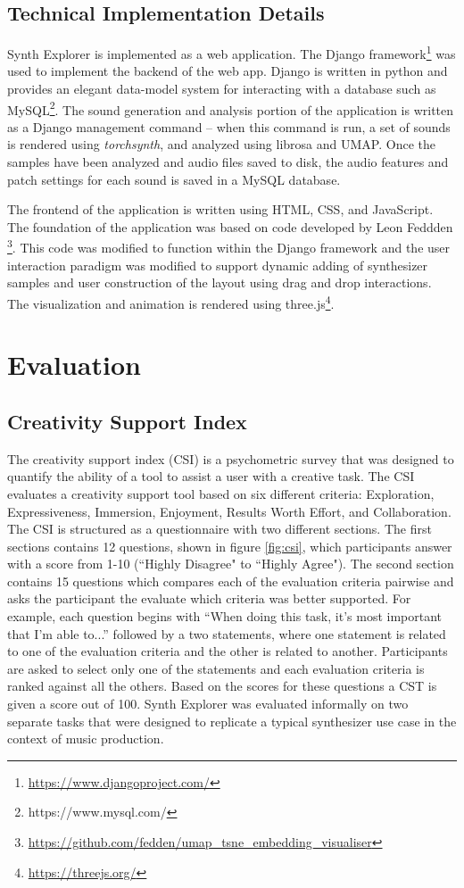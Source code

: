 \subsection{Technical Implementation Details}
Synth Explorer is implemented as a web application. The Django framework\footnote{\url{https://www.djangoproject.com/}} was used to implement the backend of the web app. Django is written in python and provides an elegant data-model system for interacting with a database such as MySQL\footnote{{https://www.mysql.com/}}. The sound generation and analysis portion of the application is written as a Django management command -- when this command is run, a set of sounds is rendered using \textit{torchsynth}, and analyzed using librosa and UMAP. Once the samples have been analyzed and audio files saved to disk, the audio features and patch settings for each sound is saved in a MySQL database.

The frontend of the application is written using HTML, CSS, and JavaScript. The foundation of the application was based on code developed by Leon Feddden \footnote{\url{https://github.com/fedden/umap_tsne_embedding_visualiser}}. This code was modified to function within the Django framework and the user interaction paradigm was modified to support dynamic adding of synthesizer samples and user construction of the layout using drag and drop interactions. The visualization and animation is rendered using three.js\footnote{\url{https://threejs.org/}}.

\section{Evaluation}
\subsection{Creativity Support Index}
The creativity support index (CSI) \cite{cherry2014quantifying} is a psychometric survey that was designed to quantify the ability of a tool to assist a user with a creative task. The CSI evaluates a creativity support tool based on six different criteria: Exploration, Expressiveness, Immersion, Enjoyment, Results Worth Effort, and Collaboration. The CSI is structured as a questionnaire with two different sections. The first sections contains 12 questions, shown in figure \ref{fig:csi}, which participants answer with a score from 1-10 (``Highly Disagree" to ``Highly Agree"). The second section contains 15 questions which compares each of the evaluation criteria pairwise and asks the participant the evaluate which criteria was better supported. For example, each question begins with “When doing this task, it’s most important that I’m able to...” followed by a two statements, where one statement is related to one of the evaluation criteria and the other is related to another. Participants are asked to select only one of the statements and each evaluation criteria is ranked against all the others. Based on the scores for these questions a CST is given a score out of 100. Synth Explorer was evaluated informally on two separate tasks that were designed to replicate a typical synthesizer use case in the context of music production.

